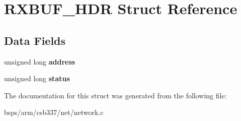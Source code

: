 \hypertarget{structRXBUF__HDR}{}\section{R\+X\+B\+U\+F\+\_\+\+H\+DR Struct Reference}
\label{structRXBUF__HDR}
\subsection*{Data Fields}
\begin{DoxyCompactItemize}
\item 
\mbox{\label{structRXBUF__HDR_a191397feb14ff6fe1f3386816b370c8e}} 
unsigned long {\bfseries address}
\item 
\mbox{\label{structRXBUF__HDR_a09a3bb5d915d85dc1c83879a2c5e0b2c}} 
unsigned long {\bfseries status}
\end{DoxyCompactItemize}


The documentation for this struct was generated from the following file\+:\begin{DoxyCompactItemize}
\item 
bsps/arm/csb337/net/network.\+c\end{DoxyCompactItemize}
